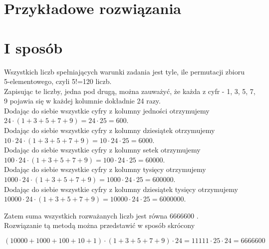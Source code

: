 \documentclass[10pt]{article}
\begin{document}
\section*{Przykładowe rozwiązania}
\section*{I sposób}
Wszystkich liczb spełniających warunki zadania jest tyle, ile permutacji zbioru\\
5-elementowego, czyli 5!=120 liczb.\\
Zapisując te liczby, jedna pod drugą, można zauważyć, że każda z cyfr - 1, 3, 5, 7, 9 pojawia się w każdej kolumnie dokładnie 24 razy.\\
Dodając do siebie wszystkie cyfry z kolumny jedności otrzymujemy\\
$24 \cdot(1+3+5+7+9)=24 \cdot 25=600$.\\
Dodając do siebie wszystkie cyfry z kolumny dziesiątek otrzymujemy\\
$10 \cdot 24 \cdot(1+3+5+7+9)=10 \cdot 24 \cdot 25=6000$.\\
Dodając do siebie wszystkie cyfry z kolumny setek otrzymujemy\\
$100 \cdot 24 \cdot(1+3+5+7+9)=100 \cdot 24 \cdot 25=60000$.\\
Dodając do siebie wszystkie cyfry z kolumny tysięcy otrzymujemy\\
$1000 \cdot 24 \cdot(1+3+5+7+9)=1000 \cdot 24 \cdot 25=600000$.\\
Dodając do siebie wszystkie cyfry z kolumny dziesiątek tysięcy otrzymujemy $10000 \cdot 24 \cdot(1+3+5+7+9)=10000 \cdot 24 \cdot 25=6000000$.

Zatem suma wszystkich rozważanych liczb jest równa 6666600 .\\
Rozwiązanie tą metodą można przedstawić w sposób skrócony

$$
(10000+1000+100+10+1) \cdot(1+3+5+7+9) \cdot 24=11111 \cdot 25 \cdot 24=6666600
$$
\end{document}
